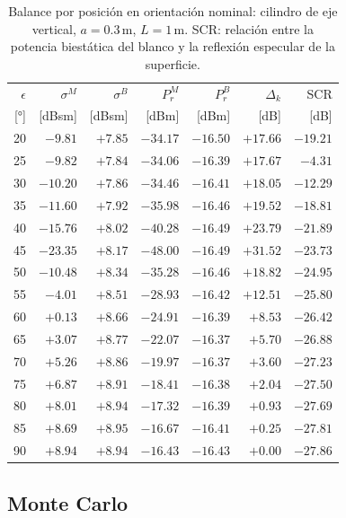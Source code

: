 \documentclass[11pt,a4paper]{report}
\begin{document}
\begin{table}[H]
\centering
\caption{Balance por posición en orientación nominal: cilindro de eje vertical, $a=0.3$\,m, $L=1$\,m. SCR: relación entre la potencia biestática del blanco y la reflexión especular de la superficie.}
\label{tab:cilindro_nominal}
\small
\begin{tabular}{@{}rrrrrrr@{}}
\toprule
$\epsilon$ & $\sigma^M$ & $\sigma^B$ & $P_r^M$ & $P_r^B$ & $\Delta_k$ & SCR \\
{[°]} & [dBsm] & [dBsm] & [dBm] & [dBm] & [dB] & [dB] \\
\midrule
20 & $-9.81$ & $+7.85$ & $-34.17$ & $-16.50$ & $+17.66$ & $-19.21$ \\
25 & $-9.82$ & $+7.84$ & $-34.06$ & $-16.39$ & $+17.67$ & $-4.31$ \\
30 & $-10.20$ & $+7.86$ & $-34.46$ & $-16.41$ & $+18.05$ & $-12.29$ \\
35 & $-11.60$ & $+7.92$ & $-35.98$ & $-16.46$ & $+19.52$ & $-18.81$ \\
40 & $-15.76$ & $+8.02$ & $-40.28$ & $-16.49$ & $+23.79$ & $-21.89$ \\
45 & $-23.35$ & $+8.17$ & $-48.00$ & $-16.49$ & $+31.52$ & $-23.73$ \\
50 & $-10.48$ & $+8.34$ & $-35.28$ & $-16.46$ & $+18.82$ & $-24.95$ \\
55 & $-4.01$ & $+8.51$ & $-28.93$ & $-16.42$ & $+12.51$ & $-25.80$ \\
60 & $+0.13$ & $+8.66$ & $-24.91$ & $-16.39$ & $+8.53$ & $-26.42$ \\
65 & $+3.07$ & $+8.77$ & $-22.07$ & $-16.37$ & $+5.70$ & $-26.88$ \\
70 & $+5.26$ & $+8.86$ & $-19.97$ & $-16.37$ & $+3.60$ & $-27.23$ \\
75 & $+6.87$ & $+8.91$ & $-18.41$ & $-16.38$ & $+2.04$ & $-27.50$ \\
80 & $+8.01$ & $+8.94$ & $-17.32$ & $-16.39$ & $+0.93$ & $-27.69$ \\
85 & $+8.69$ & $+8.95$ & $-16.67$ & $-16.41$ & $+0.25$ & $-27.81$ \\
90 & $+8.94$ & $+8.94$ & $-16.43$ & $-16.43$ & $+0.00$ & $-27.86$ \\
\bottomrule
\end{tabular}
\end{table}

\subsection{Monte Carlo}
\end{document}
